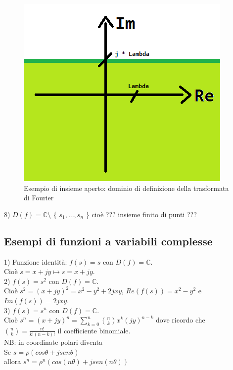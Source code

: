 \begin{figure}[h]
	\centering
	\includegraphics[scale=0.75]{immagini/dominioDefFourier}
	\caption{ Esempio di insieme aperto: dominio di definizione della trasformata di Fourier }
	\label{fig: dominioDefFourier}
\end{figure}



8) $ D(f) = \mathbb{C} \setminus$  \{ $ s_{1},...,s_{n}  $ \}  cioè ??? insieme finito di punti ???

\subsection*{Esempi di funzioni a variabili complesse}
1) Funzione identità: $ f(s) = s$ con $ D(f) = \mathbb{C}$.\\
Cioè $ s=x+jy \mapsto s=x+jy $.\\

2) $ f(s) = s^{2}$ con $ D(f) = \mathbb{C}$.\\
Cioè $ s^{2} = (x+jy)^{2} = x^{2}-y^{2} +2jxy $, $ Re(f(s)) = x^{2}-y^{2} $ e $ Im(f(s)) = 2jxy $. \\

3) $ f(s) = s^{n}$ con $ D(f) = \mathbb{C}$.\\
Cioè $ s^{n} = (x+jy)^{n} = \sum_{k=0}^n \binom{n}{k} x^{k} (jy)^{n-k} $ dove ricordo che $ \binom{n}{k} = \frac{n!}{k! (n-k)!} $ il coefficiente binomiale. \\
NB: in coordinate polari diventa \\
Se $ s = \rho (cos\theta + j sen\theta) $ \\
allora $ s^{n} = \rho^{n} (cos(n\theta) + j sen(n\theta ) ) $ \\


